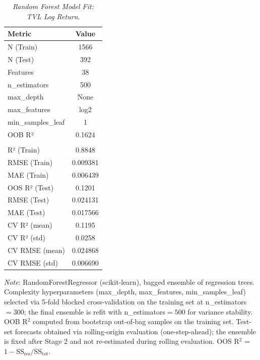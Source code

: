 \begin{table}[h]
  \centering
  \caption{\textit{Random Forest Model Fit: TVL Log Return}.}
  \label{tab:rffit}
  \begin{tabular}{lc}
    \toprule
    \textbf{Metric} & \textbf{Value} \\ 
    \midrule
    N (Train) & 1566 \\ 
    N (Test) & 392 \\ 
    Features & 38 \\ 
    n\_estimators & 500 \\ 
    max\_depth & None \\ 
    max\_features & log2 \\ 
    min\_samples\_leaf & 1 \\ 
    OOB R² & 0.1624 \\ 
     &  \\ 
    R² (Train) & 0.8848 \\ 
    RMSE (Train) & 0.009381 \\ 
    MAE (Train) & 0.006439 \\ 
    OOS R² (Test) & 0.1201 \\ 
    RMSE (Test) & 0.024131 \\ 
    MAE (Test) & 0.017566 \\ 
    CV R² (mean) & 0.1195 \\ 
    CV R² (std) & 0.0258 \\ 
    CV RMSE (mean) & 0.024868 \\ 
    CV RMSE (std) & 0.006690 \\ 
    \bottomrule
  \end{tabular}
  \vspace{2pt}
  \footnotesize{\textit{Note}: RandomForestRegressor (scikit-learn), bagged ensemble of regression trees. Complexity hyperparameters (max\_depth, max\_features, min\_samples\_leaf) selected via 5-fold blocked cross-validation on the training set at n\_estimators$=300$; the final ensemble is refit with n\_estimators$=500$ for variance stability. OOB R$^2$ computed from bootstrap out-of-bag samples on the training set. Test-set forecasts obtained via rolling-origin evaluation (one-step-ahead); the ensemble is fixed after Stage 2 and not re-estimated during rolling evaluation. OOS R$^2$ = $1 - \text{SS}_{\text{res}} / \text{SS}_{\text{tot}}$.}\\
\end{table}